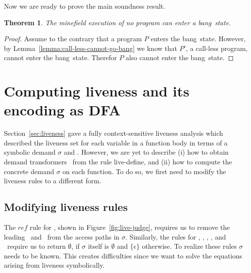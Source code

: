 \documentclass[preprint,9pt]{sigplanconf}
\newcommand{\warning}[1]{{\color{Myred}{#1}}}
\newcommand{\bang}{\mbox{\sc bang}}
\newtheorem{theorem}{Theorem}[section]
\begin{document}
Now we are ready to prove the main soundness result.

\begin{theorem}
The  minefield  execution of  no  program  can enter  a
\bang\ state.
\end{theorem}
 
\begin{proof}
Assume to  the contrary that  a program $P$  enters the
\bang\  state.  \warning{We can  transform  $P$  to a  call-less
program $P'$ such that  the minefield executions of $P$
and $P'$  are identical  except for change  of variable
names. }             However,                 by
Lemma~\ref{lemma:call-less-cannot-go-bang} we know that
$P'$,   a   call-less   program,   cannot   enter   the
\bang\  state.  Therefor  $P$  also  cannot  enter  the
\bang\ state.
\end{proof}
 




\section{Computing liveness and its encoding as DFA}\label{sec:computing}
Section~\ref{sec:liveness}  gave   a  fully context-sensitive
liveness analysis which 
described the  liveness set for  each variable  in a function  body in
terms of  a symbolic demand  $\sigma$ and \Lfonly.  However,  we are yet
to describe  (i) how to obtain demand  transformers \Lfonly\ from
the  rule {\sc  live-define}, and  (ii)  how to  compute the  concrete
demand $\sigma$  on each function.   To do so,  we first need to  modify the
liveness rules to a different form.

\subsection{Modifying liveness rules}

The   $\mathit{ref}$   rule   for   \CONS,   shown   in
Figure~\ref{fig:live-judge}, requires us  to remove the
leading  \acar\ and  \acdr\  from the  access paths  in
$\sigma$.  Similarly, the rules  for \CAR, \CDR, \PRIM,
\NULLQ, and \SIF\ require  us to return $\emptyset$, if
$\sigma$      itself       is      $\emptyset$      and
$\lbrace\epsilon\rbrace$  otherwise.  To  realize these
rules  $\sigma$   needs  to  be  known.   This  creates
difficulties  since  we  want to  solve  the  equations
arising from liveness symbolically.
\end{document}
